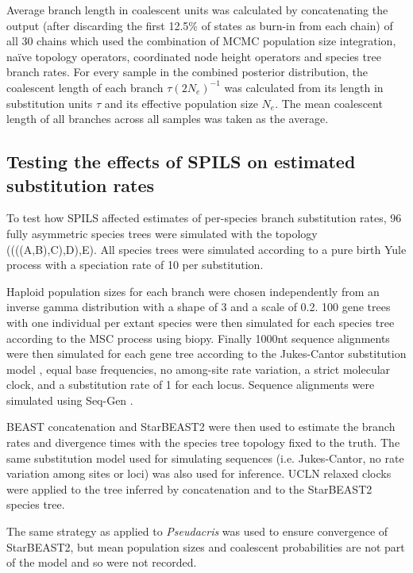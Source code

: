 \documentclass[nogrid]{MBE}%
\begin{document}
Average branch length in coalescent units was calculated by concatenating the
output (after discarding the first 12.5\% of states as burn-in from each
chain) of all 30 chains which used the combination of MCMC population size
integration, na\"ive topology operators, coordinated node height operators and
species tree branch rates. For every sample in the combined posterior
distribution, the coalescent length of each branch $\tau(2N_e)^{-1}$ was
calculated from its length in substitution units $\tau$ and its effective
population size $N_e$. The mean coalescent length of all branches across all
samples was taken as the average.

\subsection{Testing the effects of SPILS on estimated substitution rates}

To test how SPILS affected estimates of per-species branch substitution rates,
96 fully asymmetric species trees were simulated with the topology
((((A,B),C),D),E). All species trees were simulated according to a pure birth Yule
process \citep{Yule21} with a speciation rate of 10 per substitution.

Haploid population sizes for each branch were chosen independently from an
inverse gamma distribution with a shape of 3 and a scale of 0.2. 100 gene trees
with one individual per extant species were then simulated for each species tree
according to the MSC process using biopy. Finally 1000nt sequence alignments
were then simulated for each gene tree according to the Jukes-Cantor
substitution model \citep{JUKES196921}, equal base frequencies, no among-site
rate variation, a strict molecular clock, and a substitution rate of 1 for each
locus. Sequence alignments were simulated using Seq-Gen \citep{Rambaut01061997}.

BEAST concatenation and StarBEAST2 were then used to estimate the branch rates
and divergence times with the species tree topology fixed to the truth. The same
substitution model used for simulating sequences (i.e. Jukes-Cantor, no rate
variation among sites or loci) was also used for inference. UCLN relaxed
clocks were applied to the tree inferred by concatenation and to the
StarBEAST2 species tree.

The same strategy as applied to \textit{Pseudacris} was used to ensure
convergence of StarBEAST2, but mean population sizes and coalescent
probabilities are not part of the model and so were not recorded.
\end{document}
